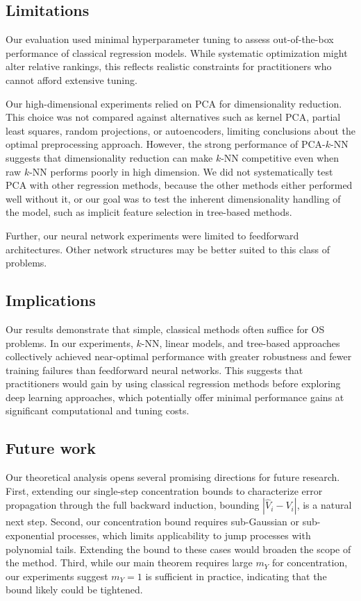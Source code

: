 \documentclass[11pt,reqno,a4paper]{amsart}
\theoremstyle{definition}
\numberwithin{equation}{section}
\DeclareMathOperator{\1}{\mathbbm{1}}
\begin{document}
\subsection{Limitations}\label{sec:limitations}
Our evaluation used minimal hyperparameter tuning to assess out-of-the-box performance of classical regression models. While systematic optimization might alter relative rankings, this reflects realistic constraints for practitioners who cannot afford extensive tuning.

Our high-dimensional experiments relied on PCA for dimensionality reduction. This choice was not compared against alternatives such as kernel PCA, partial least squares, random projections, or autoencoders, limiting conclusions about the optimal preprocessing approach. However, the strong performance of PCA-$k$-NN suggests that dimensionality reduction can make $k$-NN competitive even when raw $k$-NN performs poorly in high dimension. We did not systematically test PCA with other regression methods, because the other methods either performed well without it, or our goal was to test the inherent dimensionality handling of the model, such as implicit feature selection in tree-based methods.

Further, our neural network experiments were limited to feedforward architectures. Other network structures may be better suited to this class of problems.

\subsection{Implications}\label{sec:implications}
Our results demonstrate that simple, classical methods often suffice for OS problems. In our experiments, $k$-NN, linear models, and tree-based approaches collectively achieved near-optimal performance with greater robustness and fewer training failures than feedforward neural networks. This suggests that practitioners would gain by using classical regression methods before exploring deep learning approaches, which potentially offer minimal performance gains at significant computational and tuning costs.

\subsection{Future work}
Our theoretical analysis opens several promising directions for future research. First, extending our single-step concentration bounds to characterize error propagation through the full backward induction, bounding $|\widehat{V}_i - V_i|$, is a natural next step. Second, our concentration bound requires sub-Gaussian or sub-exponential processes, which limits applicability to jump processes with polynomial tails. Extending the bound to these cases would broaden the scope of the method. Third, while our main theorem requires large $m_Y$ for concentration, our experiments suggest $m_Y = 1$ is sufficient in practice, indicating that the bound likely could be tightened.
\end{document}
